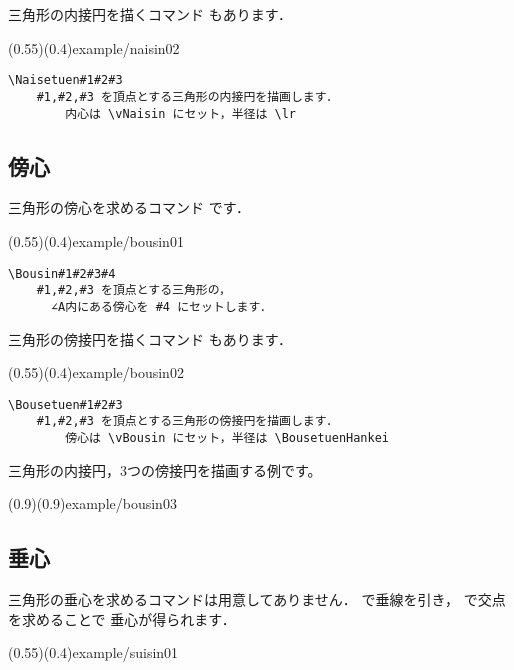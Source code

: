 三角形の内接円を描くコマンド  もあります．

\showexample[内接円](0.55)(0.4){example/naisin02}

\begin{boxnote}
\begin{verbatim}
\Naisetuen#1#2#3
    #1,#2,#3 を頂点とする三角形の内接円を描画します．
        内心は \vNaisin にセット，半径は \lr
\end{verbatim}
\end{boxnote}

\subsection{傍心}
三角形の傍心を求めるコマンド  です．

\showexample[傍心](0.55)(0.4){example/bousin01}

\begin{boxnote}
\begin{verbatim}
\Bousin#1#2#3#4
    #1,#2,#3 を頂点とする三角形の，
      ∠A内にある傍心を #4 にセットします．
\end{verbatim}
\end{boxnote}


三角形の傍接円を描くコマンド  もあります．

\showexample[傍接円](0.55)(0.4){example/bousin02}

\begin{boxnote}
\begin{verbatim}
\Bousetuen#1#2#3
    #1,#2,#3 を頂点とする三角形の傍接円を描画します．
        傍心は \vBousin にセット，半径は \BousetuenHankei
\end{verbatim}
\end{boxnote}

三角形の内接円，3つの傍接円を描画する例です。

\showexample[内接円と傍接円](0.9)(0.9){example/bousin03}

\subsection{垂心}
三角形の垂心を求めるコマンドは用意してありません．
 で垂線を引き， で交点を求めることで
垂心が得られます．

\showexample[垂心](0.55)(0.4){example/suisin01}

